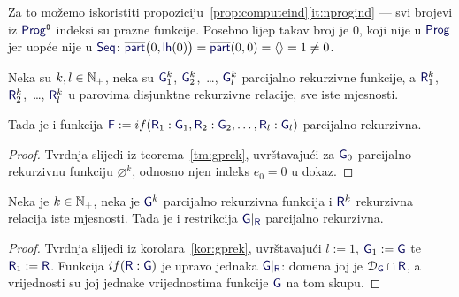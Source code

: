 Za to možemo iskoristiti propoziciju~\ref{prop:computeind}\eqref{it:nprogind} --- svi brojevi iz $\f{Prog}\kompl$ indeksi su prazne funkcije. Posebno lijep takav broj je $0$, koji nije u $\f{Prog}$ jer uopće nije u $\f{Seq}$: $\overline{\f{part}}\bigl(0,\f{lh}(0)\bigr)=\overline{\f{part}}(0,0)=\langle\rangle=1\ne0$.

\begin{korolar}[{name=[{teorem o grananju, parcijalno rekurzivna verzija, bez "inače"}]}]\label{kor:gprek}
Neka su $k,l\in{\mathbb N}_+$, neka su $\f G_1^k$, $\f G_2^k$,~\ldots, $\f G_l^k$ parcijalno rekurzivne funkcije, a $\f R_1^k$, $\f R_2^k$,~\ldots, $\f R_l^k$ u parovima disjunktne rekurzivne relacije, sve iste mjesnosti.

Tada je i funkcija $\f F:=\IF{\f R_1:\f G_1,\f R_2:\f G_2,\dots,\f R_l:\f G_l}$ parcijalno rekurzivna.
\end{korolar}
\begin{proof}
Tvrdnja slijedi iz teorema~\ref{tm:gprek}, uvrštavajući za $\f G_0$ parcijalno rekurzivnu funkciju $\varnothing^k$, odnosno njen indeks $e_0=0$ u dokaz.
\end{proof}

\begin{korolar}[{name=[restrikcija na rekurzivan skup čuva parcijalnu rekurzivnost]}]\label{kor:restrprek}
Neka je $k\in{\mathbb N}_+$, neka je $\f G^k$ parcijalno rekurzivna funkcija i $\f R^k$ rekurzivna relacija iste mjesnosti. Tada je i restrikcija $\f G|_{\f R}$ parcijalno rekurzivna.
\end{korolar}
\begin{proof}
Tvrdnja slijedi iz korolara~\ref{kor:gprek}, uvrštavajući $l:=1$, $\f G_1:=\f G$ te $\f R_1:=\f R$. Funkcija $\IF{\f R:\f G}$ je upravo jednaka $\f G|_{\f R}$: domena joj je $\dom{\f G}\cap\f R$, a vrijednosti su joj jednake vrijednostima funkcije $\f G$ na tom skupu.
\end{proof}

